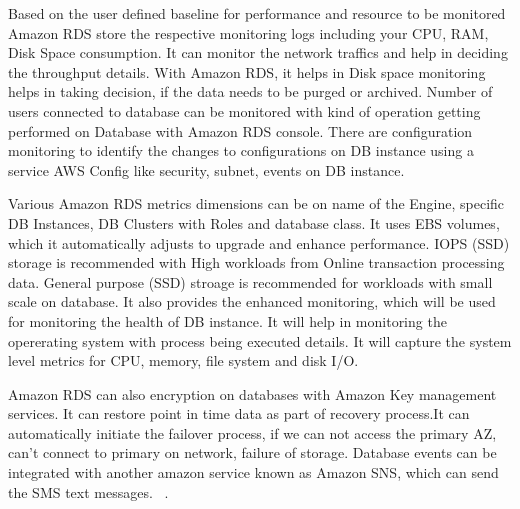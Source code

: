 Based on the user defined baseline for performance and resource to be monitored 
Amazon RDS store the respective monitoring logs including your CPU, RAM, Disk 
Space consumption. It can monitor the network traffics and help in deciding 
the throughput details. With Amazon RDS, it helps in Disk space monitoring 
helps in taking decision, if the data needs to be purged or archived.
Number of users connected to database can be monitored with kind of operation 
getting performed on Database with Amazon RDS console. There are configuration
monitoring to identify the changes to configurations on DB instance using a 
service AWS Config like security, subnet, events on DB instance.

Various Amazon RDS metrics dimensions can be on name of the Engine, specific 
DB Instances, DB Clusters with Roles and database class. 
It uses EBS volumes, which it automatically adjusts to upgrade and 
enhance performance.
IOPS (SSD) storage is recommended with High workloads from Online 
transaction processing data.
General purpose (SSD) stroage is recommended for workloads with small
scale on database.
It also provides the enhanced monitoring, which will be used for monitoring 
the health of DB instance. It will help in monitoring the opererating system 
with process being executed details. It will capture the system level metrics 
for CPU, memory, file system and disk I/O.


Amazon RDS can also encryption on databases with Amazon Key management services. 
It can restore point in time data as part of recovery process.It can 
automatically initiate the failover process, if we can not access the 
primary AZ, can't connect to primary on network, failure of storage.
Database events can be integrated with another amazon service known as
Amazon SNS, which can send the SMS text messages.
~\cite{hid-sp18-520-amardsmon}.

